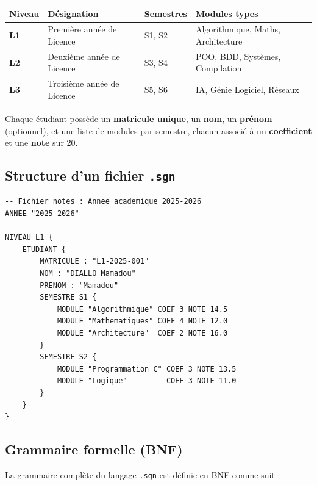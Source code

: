 \documentclass[10pt,a4paper]{article}
\begin{document}
\begin{center}
\begin{tabularx}{0.85\linewidth}{>{\bfseries}l l l l}
\toprule
Niveau & Désignation & Semestres & Modules types \\
\midrule
L1 & Première année de Licence  & S1, S2 & Algorithmique, Maths, Architecture \\
L2 & Deuxième année de Licence  & S3, S4 & POO, BDD, Systèmes, Compilation    \\
L3 & Troisième année de Licence & S5, S6 & IA, Génie Logiciel, Réseaux        \\
\bottomrule
\end{tabularx}
\end{center}

Chaque étudiant possède un \textbf{matricule unique}, un \textbf{nom}, un \textbf{prénom}
(optionnel), et une liste de modules par semestre, chacun associé à un \textbf{coefficient}
et une \textbf{note} sur 20.

\subsection{Structure d'un fichier \texttt{.sgn}}

\begin{lstlisting}[language=SGN, caption={Extrait du fichier \texttt{test\_valide.sgn}}]
-- Fichier notes : Annee academique 2025-2026
ANNEE "2025-2026"

NIVEAU L1 {
    ETUDIANT {
        MATRICULE : "L1-2025-001"
        NOM : "DIALLO Mamadou"
        PRENOM : "Mamadou"
        SEMESTRE S1 {
            MODULE "Algorithmique" COEF 3 NOTE 14.5
            MODULE "Mathematiques" COEF 4 NOTE 12.0
            MODULE "Architecture"  COEF 2 NOTE 16.0
        }
        SEMESTRE S2 {
            MODULE "Programmation C" COEF 3 NOTE 13.5
            MODULE "Logique"         COEF 3 NOTE 11.0
        }
    }
}
\end{lstlisting}

\subsection{Grammaire formelle (BNF)}

La grammaire complète du langage \texttt{.sgn} est définie en BNF comme suit :
\end{document}
